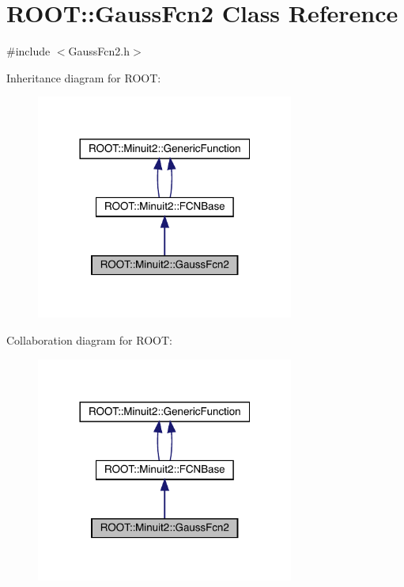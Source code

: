 \hypertarget{classROOT_1_1Minuit2_1_1GaussFcn2}{}\section{R\+O\+OT\+:\+:Gauss\+Fcn2 Class Reference}
\label{classROOT_1_1Minuit2_1_1GaussFcn2}


{\ttfamily \#include $<$Gauss\+Fcn2.\+h$>$}



Inheritance diagram for R\+O\+OT\+:\nopagebreak
\begin{figure}[H]
\begin{center}
\leavevmode
\includegraphics[width=240pt]{de/dec/classROOT_1_1Minuit2_1_1GaussFcn2__inherit__graph}
\end{center}
\end{figure}


Collaboration diagram for R\+O\+OT\+:\nopagebreak
\begin{figure}[H]
\begin{center}
\leavevmode
\includegraphics[width=240pt]{d9/d32/classROOT_1_1Minuit2_1_1GaussFcn2__coll__graph}
\end{center}
\end{figure}

